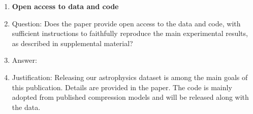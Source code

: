 \begin{enumerate}
\item {\bf Open access to data and code}
    \item[] Question: Does the paper provide open access to the data and code, with sufficient instructions to faithfully reproduce the main experimental results, as described in supplemental material?
    \item[] Answer: \answerYes{} %
    \item[] Justification: Releasing our astrophysics dataset is among the main goals of this publication. Details are provided in the paper. The code is mainly adopted from published compression models and will be released along with the data. 



\end{enumerate}
